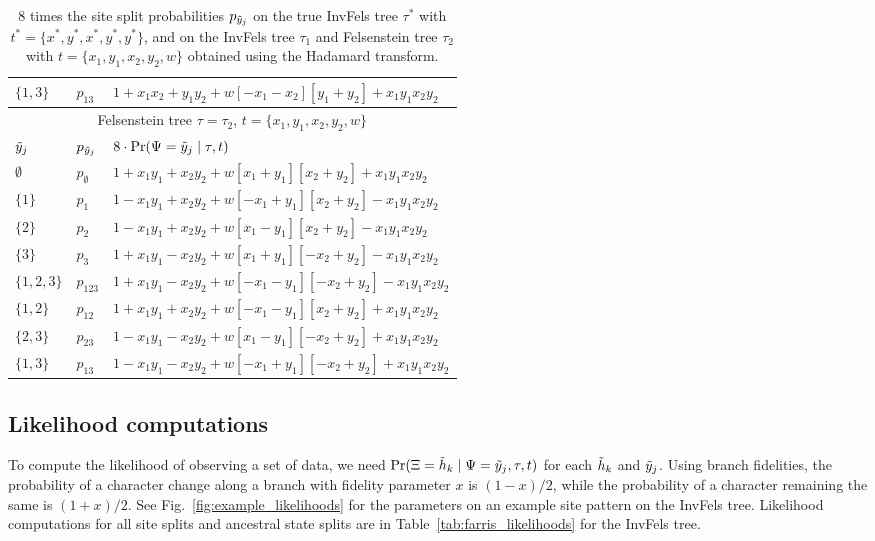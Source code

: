 \begin{table}[ht]
\begin{tabular}{|l|l|l|}
    $\{1,3\}$   & $p_{13}$          &$1 + x_1x_2 +  y_1y_2 +  w[- x_1 - x_2][  y_1 + y_2] + x_1y_1x_2y_2$\\
    \hline
    \multicolumn{3}{c}{Felsenstein tree $\tau=\tau_2$, $t=\{x_1,y_1,x_2,y_2,w\}$}\\
    \hline
$\tilde{y}_j$  & $p_{\tilde{y}_j}$ &$8\cdot\Pr(\Psi=\tilde{y}_j \mid \tau,t)$\\
    \hline
    $\emptyset$ & $p_{\emptyset}$   &$1 + x_1y_1 +  x_2y_2 +  w[  x_1 + y_1][  x_2 + y_2] + x_1y_1x_2y_2$\\
    $\{1\}$     & $p_{1}$           &$1 - x_1y_1 +  x_2y_2 +  w[ -x_1 + y_1][  x_2 + y_2] - x_1y_1x_2y_2$\\
    $\{2\}$     & $p_{2}$           &$1 - x_1y_1 +  x_2y_2 +  w[  x_1 - y_1][  x_2 + y_2] - x_1y_1x_2y_2$\\
    $\{3\}$     & $p_{3}$           &$1 + x_1y_1 -  x_2y_2 +  w[  x_1 + y_1][ -x_2 + y_2] - x_1y_1x_2y_2$\\
    $\{1,2,3\}$ & $p_{123}$         &$1 + x_1y_1 -  x_2y_2 +  w[ -x_1 - y_1][ -x_2 + y_2] - x_1y_1x_2y_2$\\
    $\{1,2\}$   & $p_{12}$          &$1 + x_1y_1 +  x_2y_2 +  w[ -x_1 - y_1][  x_2 + y_2] + x_1y_1x_2y_2$\\
    $\{2,3\}$   & $p_{23}$          &$1 - x_1y_1 -  x_2y_2 +  w[  x_1 - y_1][ -x_2 + y_2] + x_1y_1x_2y_2$\\
    $\{1,3\}$   & $p_{13}$          &$1 - x_1y_1 -  x_2y_2 +  w[ -x_1 + y_1][ -x_2 + y_2] + x_1y_1x_2y_2$\\
    \hline
\end{tabular}
\caption{8 times the site split probabilities $p_{\tilde{y}_j}$ on the true InvFels tree $\tau^*$ with $t^*=\{x^*,y^*,x^*,y^*,y^*\}$, and on the InvFels tree $\tau_1$ and Felsenstein tree $\tau_2$ with $t=\{x_1,y_1,x_2,y_2,w\}$ obtained using the Hadamard transform.
}
\label{tab:gen-sitepatprob}
\end{table}

\subsection*{Likelihood computations}

To compute the likelihood of observing a set of data, we need $\Pr(\Xi=\tilde{h}_k \mid \Psi=\tilde{y}_j, \tau, t)$ for each $\tilde{h}_k$ and $\tilde{y}_j$.
Using branch fidelities, the probability of a character change along a branch with fidelity parameter $x$ is $(1-x)/2$, while the probability of a character remaining the same is $(1+x)/2$.
See Fig.~\ref{fig:example_likelihoods} for the parameters on an example site pattern on the InvFels tree.
Likelihood computations for all site splits and ancestral state splits are in Table~\ref{tab:farris_likelihoods} for the InvFels tree.

